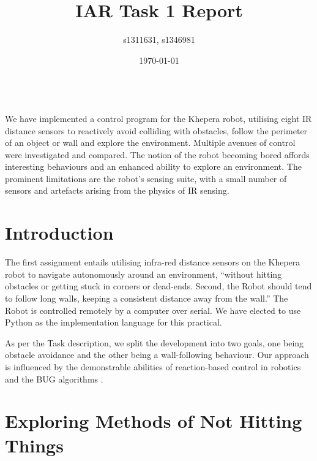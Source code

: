 \documentclass[11pt, a4paper]{article}
\renewenvironment{abstract}{%
{\mdseries\scshape\Large\abstractname}
\vspace{1em}\\
}{\par\noindent}
\begin{document}
\title{IAR Task 1 Report}
\author{s1311631, s1346981}
\date{\today}
\maketitle



\begin{abstract}
  We have implemented a control program for the Khepera robot, utilising eight IR distance
  sensors to reactively avoid colliding with obstacles, follow the perimeter of an object 
  or wall  and explore the environment. Multiple avenues of control were investigated and 
  compared. The notion of the robot becoming bored affords interesting behaviours and an 
  enhanced ability to explore an environment. The prominent limitations are the robot's 
  sensing suite, with a small number of sensors and artefacts arising from the physics 
  of IR sensing.
\end{abstract}



\section{Introduction}

The first assignment entails utilising infra-red distance sensors on the Khepera 
robot to navigate autonomously around an environment, ``without hitting obstacles 
or getting stuck in corners or dead-ends. Second, the Robot should tend to follow long walls, 
keeping a consistent distance away from the wall.'' The Robot is controlled remotely 
 by a computer over serial. We have elected to use Python as the 
implementation language for this practical.

As per the Task description, we split the development into two goals, one being obstacle 
avoidance and the other being a wall-following behaviour. Our approach is influenced 
by the demonstrable abilities of reaction-based control in robotics and the BUG 
algorithms \cite{principlesrobot}.



\section{Exploring Methods of Not Hitting Things}
\end{document}
